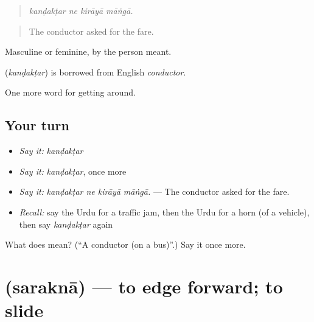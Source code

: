 \begin{quote}
   
\end{quote}

\begin{quote}
\emph{kanḍakṭar ne kirāyā māṅgā.}
\end{quote}

\begin{quote}
The conductor asked for the fare.
\end{quote}

Masculine or feminine, by the person meant.

\begin{cousinweb}
\textbf{} (\emph{kanḍakṭar}) is borrowed from English \emph{conductor}.
\end{cousinweb}

\begin{grammarlens}[title={What you've built}]
One more word for getting around.
\end{grammarlens}

\subsection*{Your turn}
\begin{itemize}
\raggedright
  \item \emph{Say it:} \emph{kanḍakṭar}
  \item \emph{Say it:} \emph{kanḍakṭar}, once more
  \item \emph{Say it:} \emph{kanḍakṭar ne kirāyā māṅgā.} — The conductor asked for the fare.
  \item \emph{Recall:} say the Urdu for a traffic jam, then the Urdu for a horn (of a vehicle), then say \emph{kanḍakṭar} again
\end{itemize}

\begin{tcolorbox}[breakable,colback=teal!4,colframe=teal!35!black,title={Before you move on}]
What does  mean? (\textquotedblleft{}A conductor (on a bus)\textquotedblright{}.) Say it once more.
\end{tcolorbox}
\section[\texorpdfstring{\ur{سرکنا} (saraknā)}{سرکنا (saraknā)}]{ (saraknā) — to edge forward; to slide}

\label{lesson:UR-C393-sarakna}



